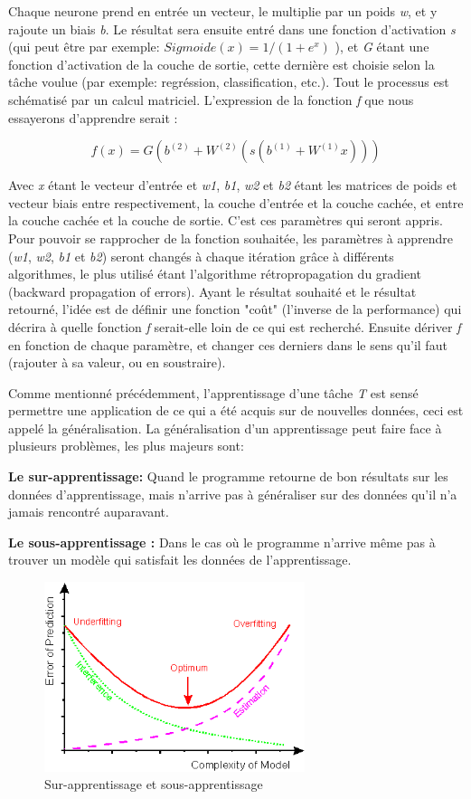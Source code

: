 Chaque neurone prend en entrée un vecteur, le multiplie par un poids \textit{w}, et y rajoute un biais \textit{b}. Le résultat sera ensuite entré dans une fonction d'activation \textit{s} (qui peut être par exemple: $Sigmoide(x) = 1/(1+e^{x})$ ), et \textit{G} étant une fonction d'activation de la couche de sortie, cette dernière est choisie selon la tâche voulue (par exemple: regréssion, classification, etc.).
Tout le processus est schématisé par un calcul matriciel. L’expression de la fonction \textit{f} que nous essayerons d'apprendre serait :

$$f(x) = G( b^{(2)} + W^{(2)}( s( b^{(1)} + W^{(1)} x)))$$

Avec \textit{x} étant le vecteur d'entrée et \textit{w1}, \textit{ b1}, \textit{w2} et \textit{b2} étant les matrices de poids et vecteur biais entre respectivement, la couche d'entrée et la couche cachée, et entre la couche cachée et la couche de sortie. C'est ces paramètres qui seront appris.
Pour pouvoir se rapprocher de la fonction souhaitée, les paramètres à apprendre (\textit{w1}, \textit{ w2}, \textit{b1} et \textit{b2}) seront changés à chaque itération grâce à différents algorithmes, le plus utilisé étant l'algorithme rétropropagation du gradient (backward propagation of errors). 
Ayant le résultat souhaité et le résultat retourné, l'idée est de définir une fonction "coût" (l'inverse de la performance) qui décrira à quelle fonction \textit{f} serait-elle loin de ce qui est recherché. Ensuite dériver \textit{f} en fonction de chaque paramètre, et changer ces derniers dans le sens qu'il faut (rajouter à sa valeur, ou en soustraire).

Comme mentionné précédemment, l'apprentissage d'une tâche \textit{T} est sensé permettre une application de ce qui a été acquis sur de nouvelles données, ceci est appelé la généralisation.
La généralisation d'un apprentissage peut faire face à plusieurs problèmes, les plus majeurs sont:

\textbf{Le sur-apprentissage:} Quand le programme retourne de bon résultats sur les données d'apprentissage, mais n'arrive pas à généraliser sur des données qu'il n'a jamais rencontré auparavant.

\textbf{Le sous-apprentissage :} Dans le cas où le programme n'arrive même pas à trouver un modèle qui satisfait les données de l'apprentissage.


\begin{figure}[H]
	\centering
		\includegraphics[width=3in]{Figures/image024.png}
	\caption[An Electron]{Sur-apprentissage et sous-apprentissage}
	\label{fig:Electron}
\end{figure}

